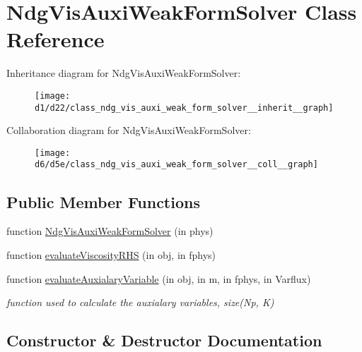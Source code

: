 \hypertarget{class_ndg_vis_auxi_weak_form_solver}{}\section{Ndg\+Vis\+Auxi\+Weak\+Form\+Solver Class Reference}
\label{class_ndg_vis_auxi_weak_form_solver}


Inheritance diagram for Ndg\+Vis\+Auxi\+Weak\+Form\+Solver\+:
\nopagebreak
\begin{figure}[H]
\begin{center}
\leavevmode
\texttt{[image: d1/d22/class\_ndg\_vis\_auxi\_weak\_form\_solver\_\_inherit\_\_graph]}
\end{center}
\end{figure}


Collaboration diagram for Ndg\+Vis\+Auxi\+Weak\+Form\+Solver\+:
\nopagebreak
\begin{figure}[H]
\begin{center}
\leavevmode
\texttt{[image: d6/d5e/class\_ndg\_vis\_auxi\_weak\_form\_solver\_\_coll\_\_graph]}
\end{center}
\end{figure}
\subsection*{Public Member Functions}
\begin{DoxyCompactItemize}
\item 
function \hyperlink{class_ndg_vis_auxi_weak_form_solver_a4f0ebb085f3c61feab591480ce4a6a57}{Ndg\+Vis\+Auxi\+Weak\+Form\+Solver} (in phys)
\item 
function \hyperlink{class_ndg_vis_auxi_weak_form_solver_ac8e64dc2624b939ace221899debaa9db}{evaluate\+Viscosity\+R\+HS} (in obj, in fphys)
\item 
function \hyperlink{class_ndg_vis_auxi_weak_form_solver_a4bcceaa358596c10a30cb6c3dcab5b2a}{evaluate\+Auxialary\+Variable} (in obj, in m, in fphys, in Varflux)
\begin{DoxyCompactList}\small\item\em function used to calculate the auxialary variables, size(\+Np, K) \end{DoxyCompactList}\end{DoxyCompactItemize}


\subsection{Constructor \& Destructor Documentation}
\mbox{\label{class_ndg_vis_auxi_weak_form_solver_a4f0ebb085f3c61feab591480ce4a6a57}} 

